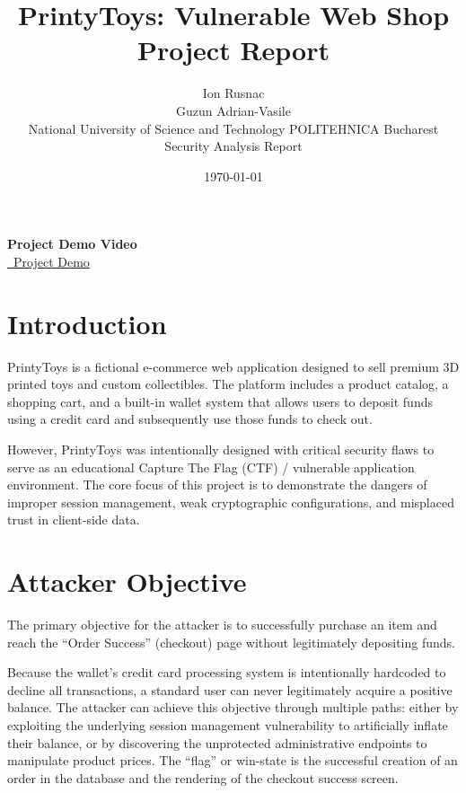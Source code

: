 \documentclass[12pt,a4paper]{article}
\title{\textbf{PrintyToys: Vulnerable Web Shop Project Report}}
\author{
Ion Rusnac \\
Guzun Adrian-Vasile \\
National University of Science and Technology POLITEHNICA Bucharest \\
Security Analysis Report }
\date{\today}
\begin{document}
\maketitle

\begin{center}
\vspace{0.5em}
\textbf{Project Demo Video} \\[0.3em]
\href{https://youtu.be/pTiv5-nIzwU}{\faYoutube \ Project Demo }
\vspace{0.5em}
\end{center}


\section{Introduction}
PrintyToys is a fictional e-commerce web application designed to sell premium 3D printed toys and custom collectibles. The platform includes a product catalog, a shopping cart, and a built-in wallet system that allows users to deposit funds using a credit card and subsequently use those funds to check out. 

However, PrintyToys was intentionally designed with critical security flaws to serve as an educational Capture The Flag (CTF) / vulnerable application environment. The core focus of this project is to demonstrate the dangers of improper session management, weak cryptographic configurations, and misplaced trust in client-side data.

\section{Attacker Objective}
The primary objective for the attacker is to successfully purchase an item and reach the ``Order Success'' (checkout) page without legitimately depositing funds. 

Because the wallet's credit card processing system is intentionally hardcoded to decline all transactions, a standard user can never legitimately acquire a positive balance. The attacker can achieve this objective through multiple paths: either by exploiting the underlying session management vulnerability to artificially inflate their balance, or by discovering the unprotected administrative endpoints to manipulate product prices. The ``flag'' or win-state is the successful creation of an order in the database and the rendering of the checkout success screen.
\end{document}
